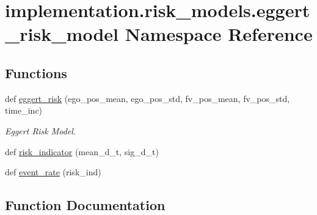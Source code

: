\hypertarget{namespaceimplementation_1_1risk__models_1_1eggert__risk__model}{}\section{implementation.\+risk\+\_\+models.\+eggert\+\_\+risk\+\_\+model Namespace Reference}
\label{namespaceimplementation_1_1risk__models_1_1eggert__risk__model}
\subsection*{Functions}
\begin{DoxyCompactItemize}
\item 
def \hyperlink{namespaceimplementation_1_1risk__models_1_1eggert__risk__model_ae8cd95e436be697a6aebcd8132c305a4}{eggert\+\_\+risk} (ego\+\_\+pos\+\_\+mean, ego\+\_\+pos\+\_\+std, fv\+\_\+pos\+\_\+mean, fv\+\_\+pos\+\_\+std, time\+\_\+inc)
\begin{DoxyCompactList}\small\item\em Eggert Risk Model. \end{DoxyCompactList}\item 
def \hyperlink{namespaceimplementation_1_1risk__models_1_1eggert__risk__model_a73b808f4ca57574bd1f01a927bd4452b}{risk\+\_\+indicator} (mean\+\_\+d\+\_\+t, sig\+\_\+d\+\_\+t)
\item 
def \hyperlink{namespaceimplementation_1_1risk__models_1_1eggert__risk__model_a0e65cd2c35a21cf84d6966cd950ff12b}{event\+\_\+rate} (risk\+\_\+ind)
\end{DoxyCompactItemize}


\subsection{Function Documentation}
\mbox{\label{namespaceimplementation_1_1risk__models_1_1eggert__risk__model_ae8cd95e436be697a6aebcd8132c305a4}} 
